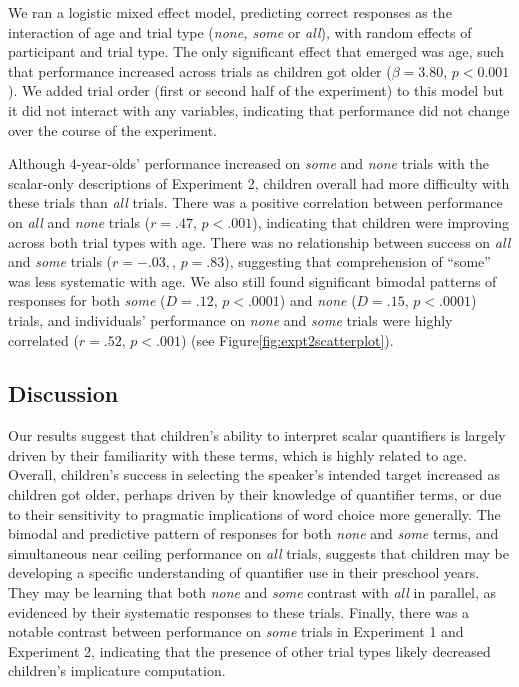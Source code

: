 \documentclass[10pt,letterpaper]{article}
\begin{document}
We ran a logistic mixed effect model, predicting correct responses as the interaction of age and trial type (\emph{none, some} or \emph{all}), with random effects of participant and trial type. The only significant effect that emerged was age, such that performance increased across trials as children got older ($\beta = 3.80$, $p < 0.001$). We added trial order (first or second half of the experiment) to this model but it did not interact with any variables, indicating that performance did not change over the course of the experiment.

Although 4-year-olds' performance increased on \emph{some} and \emph{none} trials with the scalar-only descriptions of Experiment 2, children overall had more difficulty with these trials than \emph{all} trials. There was a positive correlation between performance on \emph{all} and \emph{none} trials ($r=.47$, $p<.001$), indicating that children were  improving across both trial types with age.  There was no relationship between success on \emph{all} and \emph{some} trials ($r=-.03,$, $p=.83$), suggesting that comprehension of ``some'' was less systematic with age. We also still found significant bimodal patterns of responses for both \emph{some} ($D=.12$, $p<.0001$) and \emph{none} ($D=.15$, $p<.0001$) trials, and individuals' performance on \emph{none} and \emph{some} trials were highly correlated ($r=.52$, $p<.001$) (see Figure\ref{fig:expt2scatterplot}). 

\subsection{Discussion}

Our results suggest that children's ability to interpret scalar quantifiers is largely driven by their familiarity with these terms, which is highly related to age. Overall, children's success in selecting the speaker's intended target increased as children got older, perhaps driven by their knowledge of quantifier terms, or due to their sensitivity to pragmatic implications of word choice more generally. The bimodal and predictive pattern of responses for both \emph{none} and \emph{some} terms, and simultaneous near ceiling performance on \emph{all} trials, suggests that children may be developing a specific understanding of quantifier use in their preschool years. They may be learning that both \emph{none} and \emph{some} contrast with \emph{all} in parallel, as evidenced by their systematic responses to these trials. Finally, there was a notable contrast between performance on \emph{some} trials in Experiment 1 and Experiment 2, indicating that the presence of other trial types likely decreased children's implicature computation. 
\end{document}
